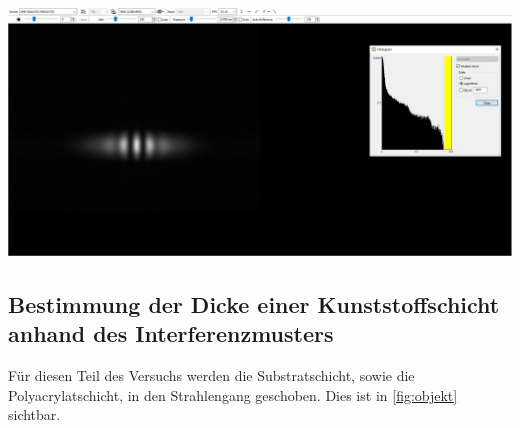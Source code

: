 \documentclass[11pt,ngerman]{scrartcl}
\begin{document}
\begin{center}
	\begin{minipage}[t]{\textwidth}
		\includegraphics[width=\textwidth]{Interfero/Versuch2/ohnefilter}
		\label{fig:ohnefilter}
	\end{minipage}
\end{center}


\subsection{Bestimmung der Dicke einer Kunststoffschicht anhand des Interferenzmusters}

Für diesen Teil des Versuchs werden die Substratschicht, sowie die Polyacrylatschicht, in den Strahlengang geschoben. Dies ist in \autoref{fig:objekt} sichtbar.
\end{document}
